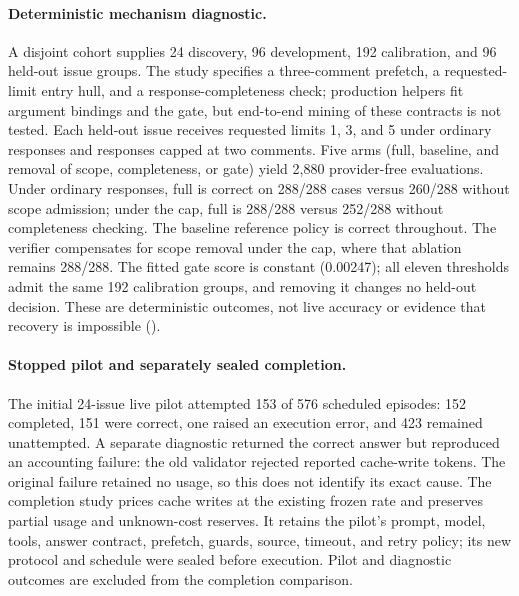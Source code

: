 \paragraph{Deterministic mechanism diagnostic.}
A disjoint cohort supplies 24 discovery, 96 development, 192 calibration, and
96 held-out issue groups. The study specifies a three-comment prefetch, a
requested-limit entry hull, and a response-completeness check; production
helpers fit argument bindings and the gate, but end-to-end mining of these
contracts is not tested. Each held-out issue receives requested limits 1, 3,
and 5 under ordinary responses and responses capped at two comments. Five arms
(full, baseline, and removal of scope, completeness, or gate) yield 2{,}880
provider-free evaluations. Under ordinary responses, full is correct on 288/288
cases versus 260/288 without scope admission; under the cap, full is 288/288
versus 252/288 without completeness checking. The baseline reference policy is
correct throughout. The verifier compensates for scope removal under the
cap, where that ablation remains 288/288. The fitted gate score is constant
(0.00247); all eleven thresholds admit the same 192 calibration groups, and
removing it changes no held-out decision. These are deterministic outcomes,
not live accuracy or evidence that recovery is impossible
().

\paragraph{Stopped pilot and separately sealed completion.}
The initial 24-issue live pilot attempted 153 of 576 scheduled episodes:
152 completed, 151 were correct, one raised an execution error, and 423 remained
unattempted. A separate diagnostic returned the correct answer but reproduced
an accounting failure: the old validator rejected reported cache-write tokens.
The original failure retained no usage, so this does not identify its exact
cause. The completion study prices cache writes at the existing frozen rate and
preserves partial usage and unknown-cost reserves. It retains the pilot's
prompt, model, tools, answer contract, prefetch, guards, source, timeout, and
retry policy; its new protocol and schedule were sealed before execution.
Pilot and diagnostic outcomes are excluded from the completion comparison.

